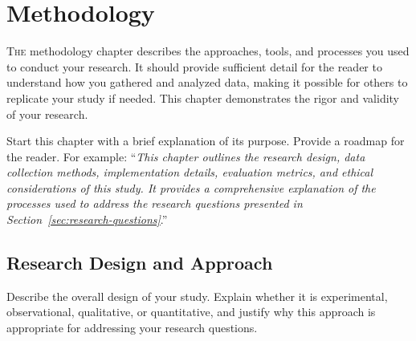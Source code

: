 %
%
%
%
%
%

\chapter{Methodology}\label{chap:methodology}
\lettrine[lines=3]{T}{he} methodology chapter describes the approaches, tools, and processes you used to conduct your research. It should provide sufficient detail for the reader to understand how you gathered and analyzed data, making it possible for others to replicate your study if needed. This chapter demonstrates the rigor and validity of your research.

Start this chapter with a brief explanation of its purpose. Provide a roadmap for the reader. For example: ``\textit{This chapter outlines the research design, data collection methods, implementation details, evaluation metrics, and ethical considerations of this study. It provides a comprehensive explanation of the processes used to address the research questions presented in Section~\ref{sec:research-questions}}.''

\section{Research Design and Approach}\label{sec:research-design}
Describe the overall design of your study. Explain whether it is experimental, observational, qualitative, or quantitative, and justify why this approach is appropriate for addressing your research questions.

